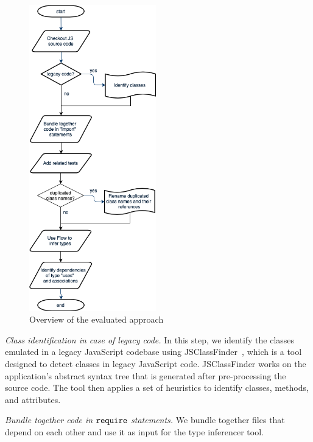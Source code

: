 \documentclass[review]{elsarticle}
\newcommand{\mcode}[1]{$\tt #1$}
\begin{document}
\begin{figure}[ht]
	\centering
	\captionsetup{justification=centering}
	\includegraphics[width=5.5cm]{fig/flowchart_draw-io.png}
	\caption{Overview of the evaluated approach}
	\label{fig:proposed-approach}
\end{figure}

\vspace{2.5 mm}

\noindent \textit{Class identification in case of legacy code.} In this step, we identify the classes emulated in a legacy JavaScript codebase using JSClassFinder~\cite{silva-cbsoft2015, leonardo-jsep2017}, which is a tool designed to detect classes in legacy JavaScript code. JSClassFinder works on the application's abstract syntax tree that is generated after pre-processing the source code. The tool then applies a set of heuristics to identify classes, methods, and attributes.%

\vspace{2.5 mm}

\noindent \textit{Bundle together code in \mcode{require} statements.} We bundle together files that depend on each other and use it as input for the type inferencer tool. 
\end{document}
